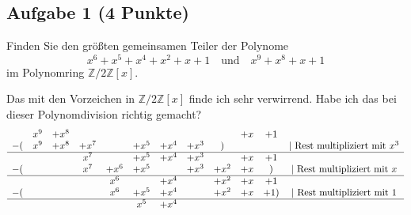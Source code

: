 \documentclass{article} %
\begin{document}
\subsection*{Aufgabe 1 (4 Punkte)}
Finden Sie den größten gemeinsamen Teiler der Polynome
\[
x^6 + x^5 + x^4 + x^2 + x + 1 \quad \text{und} \quad x^9 + x^8 + x + 1
\]
im Polynomring \( \mathbb{Z}/2\mathbb{Z}[x] \).
\begin{mybox}
Das mit den Vorzeichen in $\mathbb{Z}/2\mathbb{Z}[x]$ finde ich sehr verwirrend. Habe ich das bei dieser Polynomdivision richtig gemacht? 
\[
\begin{array}{cccccccccccc}
    & x^9   & + x^8 & & & & && &   + x & + 1 &  \\
-(  & x^9   & + x^8 & + x^7 &   & +  x^5 & + x^4 & + x^3& ) &   & & | \text{ Rest multipliziert mit } x^3 \\ \hline
    &       &       &  x^7 &       & + x^5 & + x^4 & +x^3  &       &+x & +1 &  \\
-(  &       &       &  x^7 &+x^6   &  +x^5 &       & +x^3  & +x^2  &+x & )& | \text{ Rest multipliziert mit } x \\ \hline
    &       &       &       & x^6   &       & +x^4  &       & +x^2  & +x& +1 \\
-(  &       &       &       & x^6   &  +x^5 & + x^4 &       & +x^2  & +x& +1) & | \text{ Rest multipliziert mit } 1 \\ \hline
&           &       &       &       & x^5  & +x^4 &       &       
\end{array}
\]


\end{mybox}
\end{document}
